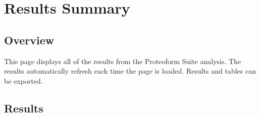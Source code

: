 
\section{Results Summary}

\subsection{Overview}
This page displays all of the results from the Proteoform Suite analysis. The results automatically refresh each time the page is loaded. Results and tables can be exported.

\subsection{Results}
